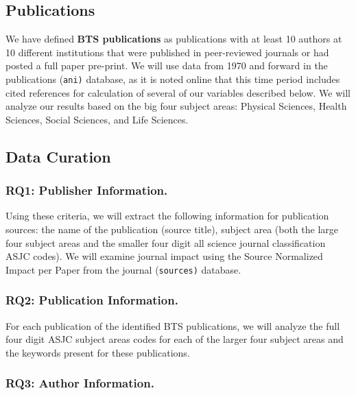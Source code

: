 \documentclass[
  man]{apa7}
\begin{document}
\hypertarget{publications}{%
\subsection{Publications}\label{publications}}

We have defined \textbf{BTS publications} as publications with at least 10
authors at 10 different institutions that were published in
peer-reviewed journals or had posted a full paper pre-print. We will use
data from 1970 and forward in the publications (\texttt{ani)} database, as it
is noted online that this time period includes cited references for
calculation of several of our variables described below. We will analyze
our results based on the big four subject areas: Physical Sciences,
Health Sciences, Social Sciences, and Life Sciences.

\hypertarget{data-curation}{%
\subsection{Data Curation}\label{data-curation}}

\hypertarget{rq1-publisher-information.}{%
\subsubsection{RQ1: Publisher Information.}\label{rq1-publisher-information.}}

Using these criteria, we will extract the following information for
publication sources: the name of the publication (source title), subject
area (both the large four subject areas and the smaller four digit all
science journal classification ASJC codes). We will examine journal
impact using the Source Normalized Impact per Paper from the journal
(\texttt{sources)} database.

\hypertarget{rq2-publication-information.}{%
\subsubsection{RQ2: Publication Information.}\label{rq2-publication-information.}}

For each publication of the identified BTS publications, we will analyze
the full four digit ASJC subject areas codes for each of the larger four
subject areas and the keywords present for these publications.

\hypertarget{rq3-author-information.}{%
\subsubsection{RQ3: Author Information.}\label{rq3-author-information.}}
\end{document}
